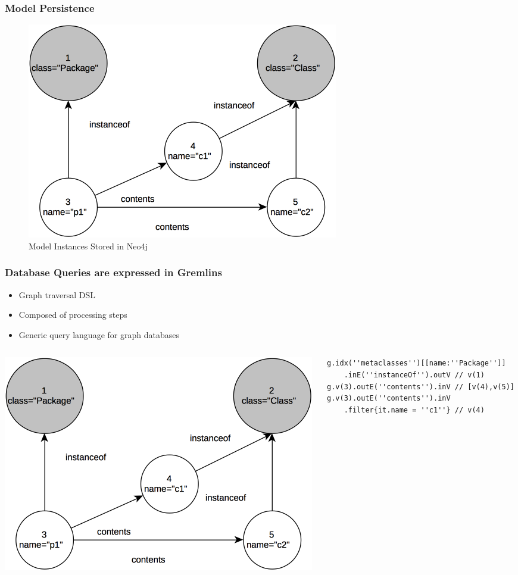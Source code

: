 \documentclass[10pt]{beamer}
\begin{document}
\begin{frame}[c]\frametitle{Model Persistence}
	\begin{figure}[htbp]
		\centering
			\includegraphics[width=.6\linewidth]{mogwai-graph.png}
		\caption{Model Instances Stored in Neo4j}
		\label{fig:label}
	\end{figure}
\end{frame}

\begin{frame}[fragile]\frametitle{Database Queries are expressed in Gremlins}
	\begin{itemize}
		\item Graph traversal DSL
		\item Composed of processing steps
		\item Generic query language for graph databases
	\end{itemize}
	\begin{columns}
		\begin{column}{0.4\textwidth}
			\includegraphics[width=\linewidth]{mogwai-graph.png}
		\end{column}
		\begin{column}{0.6\textwidth}
\begin{lstlisting}[language=gremlin]
g.idx(''metaclasses'')[[name:''Package'']]
    .inE(''instanceOf'').outV // v(1)
g.v(3).outE(''contents'').inV // [v(4),v(5)]
g.v(3).outE(''contents'').inV
    .filter{it.name = ''c1''} // v(4)
\end{lstlisting}
		\end{column}
	\end{columns}
	
\end{frame}
\end{document}

